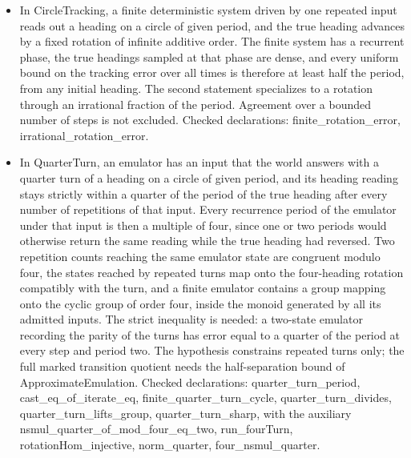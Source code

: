 \documentclass[11pt,a4paper]{article}
\newcommand{\lean}[1]{{\ttfamily\small
  \let\leanunderscore\_\def\_{\leanunderscore\allowbreak}#1}}
\begin{document}
\begin{itemize}[leftmargin=1.4em,itemsep=1pt]
{Checked declarations: \lean{successorError}, \lean{successorRadius}, \lean{deterministic\_error\_floor}, \lean{diameter\_le\_twice\_radius}, \lean{radius\_le\_diameter}, \lean{affine\_hidden\_minimax}, \lean{weakGain}, \lean{weakRetained}, \lean{weak\_retained\_affine}, \lean{weak\_gain\_sum}, \lean{weak\_retained\_minimax}.\par}
\item {\raggedright In \lean{CircleTracking}, a finite deterministic system driven by one repeated input reads out a heading on a circle of given period, and the true heading advances by a fixed rotation of infinite additive order. The finite system has a recurrent phase, the true headings sampled at that phase are dense, and every uniform bound on the tracking error over all times is therefore at least half the period, from any initial heading. The second statement specializes to a rotation through an irrational fraction of the period. Agreement over a bounded number of steps is not excluded.
Checked declarations: \lean{finite\_rotation\_error}, \lean{irrational\_rotation\_error}.\par}
\item {\raggedright In \lean{QuarterTurn}, an emulator has an input that the world answers with a quarter turn of a heading on a circle of given period, and its heading reading stays strictly within a quarter of the period of the true heading after every number of repetitions of that input. Every recurrence period of the emulator under that input is then a multiple of four, since one or two periods would otherwise return the same reading while the true heading had reversed. Two repetition counts reaching the same emulator state are congruent modulo four, the states reached by repeated turns map onto the four-heading rotation compatibly with the turn, and a finite emulator contains a group mapping onto the cyclic group of order four, inside the monoid generated by all its admitted inputs. The strict inequality is needed: a two-state emulator recording the parity of the turns has error equal to a quarter of the period at every step and period two. The hypothesis constrains repeated turns only; the full marked transition quotient needs the half-separation bound of \lean{ApproximateEmulation}.
Checked declarations: \lean{quarter\_turn\_period}, \lean{cast\_eq\_of\_iterate\_eq}, \lean{finite\_quarter\_turn\_cycle}, \lean{quarter\_turn\_divides}, \lean{quarter\_turn\_lifts\_group}, \lean{quarter\_turn\_sharp}, with the auxiliary \lean{nsmul\_quarter\_of\_mod\_four\_eq\_two}, \lean{run\_fourTurn}, \lean{rotationHom\_injective}, \lean{norm\_quarter}, \lean{four\_nsmul\_quarter}.\par}

\end{itemize}
\end{document}
